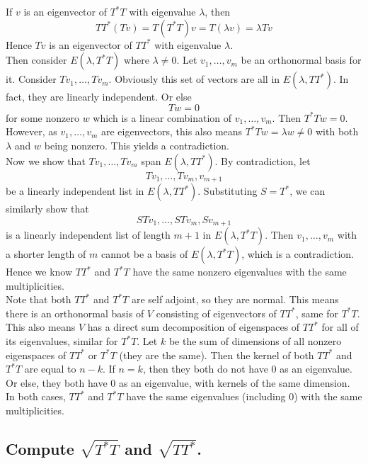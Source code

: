 \documentclass[answers]{exam}
\begin{document}
\begin{questions}
\begin{solution}
	If $v$ is an eigenvector of $T^*T$ with eigenvalue $\lambda$, then
	$$TT^*(Tv) = T(T^*T)v = T(\lambda v) = \lambda Tv$$
	Hence $Tv$ is an eigenvector of $TT^*$ with eigenvalue $\lambda$. \\
	Then consider $E(\lambda,T^*T)$ where $\lambda \neq 0$. Let $v_1,\dots,v_m$ be an orthonormal basis for it. Consider $Tv_1,\dots,Tv_m$. Obviously this set of vectors are all in $E(\lambda,TT^*)$. In fact, they are linearly independent. Or else
	$$Tw = 0$$
	for some nonzero $w$ which is a linear combination of $v_1,\dots,v_m$. Then $T^*Tw = 0$. However, as $v_1,\dots,v_m$ are eigenvectors, this also means $T^*Tw = \lambda w \neq 0$ with both $\lambda$ and $w$ being nonzero. This yields a contradiction. \\
	Now we show that $Tv_1,\dots,Tv_m$ span $E(\lambda,TT^*)$. By contradiction, let
	$$Tv_1,\dots,Tv_m,v_{m+1}$$
	be a linearly independent list in $E(\lambda,TT^*)$. Substituting $S = T^*$, we can similarly show that
	$$STv_1,\dots,STv_m,Sv_{m+1}$$
	is a linearly independent list of length $m+1$ in $E(\lambda,T^*T)$. Then $v_1,\dots,v_m$ with a shorter length of $m$ cannot be a basis of $E(\lambda,T^*T)$, which is a contradiction. Hence we know $TT^*$ and $T^*T$ have the same nonzero eigenvalues with the same multiplicities. \\
	Note that both $TT^*$ and $T^*T$ are self adjoint, so they are normal. This means there is an orthonormal basis of $V$ consisting of eigenvectors of $TT^*$, same for $T^*T$. This also means $V$ has a direct sum decomposition of eigenspaces of $TT^*$ for all of its eigenvalues, similar for $T^*T$. Let $k$ be the sum of dimensions of all nonzero eigenspaces of $TT^*$ or $T^*T$ (they are the same). Then the kernel of both $TT^*$ and $T^*T$ are equal to $n-k$. If $n=k$, then they both do not have 0 as an eigenvalue. Or else, they both have 0 as an eigenvalue, with kernels of the same dimension. In both cases, $TT^*$ and $T^*T$ have the same eigenvalues (including 0) with the same multiplicities.
\end{solution}


\begin{parts}
	\part{Compute $\sqrt{T^*T}$ and $\sqrt{TT^*}$.}

\end{parts}
\end{questions}
\end{document}
